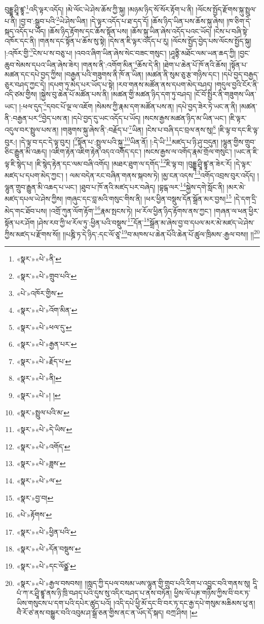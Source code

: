 བུདྡྷ་ཤྲཱི་ཛྙཱ་\footnote{«སྣར་»«པེ་»ནི་}འདི་ལྟར་འདོད། །མེ་ལོང་ཡེ་ཤེས་ཆོས་ཀྱི་སྐུ། །མཉམ་ཉིད་སོ་སོར་རྟོག་པ་ནི། །ལོངས་སྤྱོད་རྫོགས་སྐུ་སྤྲུལ་པ་ནི། །བྱ་བ་:སྒྲུབ་པའི་\footnote{«སྣར་»«པེ་»གྲུབ་པའི་}ཡེ་ཤེས་ཡིན། །དེ་ལྟར་འདོད་པ་ཐ་དད་དོ། །ཆོས་ཉིད་ཡིན་པས་ཆོས་སྐུ་ཞེས། །ཁ་ཅིག་དེ་སྐད་འདོད་པ་ཡོད། །ཆོས་ཉིད་རྟོགས་དང་ཆོས་སྟོན་པས། །ཆོས་སྐུ་ཡིན་ཞེས་འདོད་པའང་ཡོད། །ངེས་པ་བཞི་སྟེ་འཁོར་དང་ནི། །གནས་དང་སྟོན་པ་ཆོས་སུ་སྟེ། །དེས་ན་ཇི་ལྟར་འདོད་པ་རུ། །ལོངས་སྤྱོད་བྱེད་པས་ལོངས་སྤྱོད་སྐུ། །:འཁོར་གྱི་\footnote{«པེ་»འཁོར་གྱིས་}ངེས་པ་ས་བཅུ་པ། །འབའ་ཞིག་ཡིན་ཞེས་སེང་བཟང་གསུང་། །ཤཱནྟི་མཐོང་ལམ་ཡན་ཆད་ཀྱི། །བྱང་ཆུབ་སེམས་དཔའ་ཡིན་ཞེས་ཟེར། །གནས་ནི་:འགོག་མིན་\footnote{«སྣར་»«པེ་»འོག་མིན་}ཆོས་དེ་ནི། །ཐེག་པ་ཆེན་པོ་ཁོ་ནའི་ཆོས། །སྟོན་པ་མཚན་དང་དཔེ་བྱད་ཀྱིས། །བརྒྱན་པའི་གཟུགས་ནི་ཁོ་ན་ཡིན། །མཚན་ནི་སུམ་ཅུ་རྩ་གཉིས་དང་། །དཔེ་བྱད་བརྒྱད་ཅུར་བཤད་ཀྱང་དེ། །དཔག་ཏུ་མེད་པར་ཡོད་པ་སྟེ། །རབ་གནས་མཚོན་ནས་དཔག་མེད་བཤད། །གདུལ་བྱའི་ངོར་ནི་འདི་ཙམ་གྱིས། །སྐྱེས་བུ་ཆེན་པོ་མཚོན་པས་ནི། །མཚན་གྱི་མཚན་ཉིད་དག་ཏུ་བཤད། །ངོ་བོ་སྤྱིར་ནི་གཟུགས་ཡིན་ཡང་། །:ཕལ་དུད་\footnote{«སྣར་»«པེ་»ཕལ་དུ་}དབང་པོ་ལྔ་ལ་འཇོག །སེམས་ཀྱི་རྣམ་དག་མཚོན་པས་ན། །དཔེ་བྱད་ཟེར་ཏེ་ཡང་ན་ནི། །མཚན་ནི་:བརྒྱན་པར་\footnote{«སྣར་»«པེ་»རྒྱན་པར་}བྱེད་པས་ན། །དཔེ་བྱད་དུ་ཡང་འདོད་པ་ཡོད། །སངས་རྒྱས་མཚན་ཉིད་མ་ཡིན་ཡང་། །ཇི་ལྟར་འདུལ་བར་སྤྲུལ་པས་ན། །གཟུགས་སྐུ་ཞེས་ནི་:བརྗོད་པ་\footnote{«སྣར་»«པེ་»རྗོད་པ་}ཡིན། །ངེས་པ་བཞི་དང་བྲལ་ནས་སུ།\footnote{«སྣར་»«པེ་»ནི།} །ཇི་ལྟ་བ་དང་ཇི་ལྟ་བུར:། །དེ་ལྟ་བ་དང་དེ་ལྟ་བུར། །\footnote{«སྣར་»«པེ་»། །}སྟོན་པ་:སྤྲུལ་པའི་སྐུ་\footnote{«སྣར་»སྤྲུལ་པའི་མ་}ཡིན་ནོ། །:དེ་ཡི་\footnote{«སྣར་»«པེ་»དེ་ཡིས་}མཛད་པ་ཉི་ཤུ་བདུན། །ལྷུན་གྱིས་གྲུབ་ཅིང་རྒྱུན་མི་འཆད། །འཇིག་རྟེན་འཇིག་རྟེན་འདའ་འགོད་དང་། །སངས་རྒྱས་ལ་འགོད་རྣམ་གྲོལ་གསུང་། །ཡང་ན་ཇི་ལྟ་ཇི་སྙེད་པ། །ཇི་སྙེད་རྟེན་དང་ལམ་བཞི་འགོད། །མཐར་ཐུག་ལ་དགོད་\footnote{«སྣར་»«པེ་»འགོད་}ཇི་ལྟ་བ། །བུདྡྷ་ཤྲཱི་ཛྙཱ་ན་ཟེར་རོ། །དེ་ལྟར་མཛད་པ་དཔག་མེད་ཀྱང་། །
ལམ་བདེན་རང་བཞིན་གནས་སྐབས་ཏེ། །མྱ་ངན་འདས་\footnote{«སྣར་»«པེ་»ཟླས་}འགོད་འབྲས་བུར་འདོད། །ལྷུན་གྲུབ་རྒྱུན་མི་འཆད་པ་ཡང་། །ཐུབ་པ་ཁོ་ནའི་མཛད་པར་བཞེད། །བྷངྒ་ལར་\footnote{«སྣར་»«པེ་»ལ་}སྐྱེས་དགེ་སློང་ནི། །མར་མེ་མཛད་དཔལ་ཡེ་ཤེས་ཀྱིས། །གཞུང་དང་བླ་མའི་གསུང་གིས་ནི། །ཕར་ཕྱིན་བསྡུས་དོན་སྒྲོན་མར་བྱས།\footnote{«སྣར་»བྱ་བ།} །དེ་དག་དྲི་མེད་གང་ཐོབ་པས། །འགྲོ་ཀུན་ལོག་རྟོག་\footnote{«པེ་»རྟོགས་}རྣམ་སྤངས་ཏེ། །ཕ་རོལ་ཕྱིན་ཉིད་རྟོགས་ནས་ཀྱང་། །གཞན་ལ་ཕན་ཕྱིར་སྟོན་པར་ཤོག །ཤེས་རབ་ཀྱི་ཕ་རོལ་ཏུ་:ཕྱིན་པའི་བསྡུས་\footnote{«སྣར་»«པེ་»ཕྱིན་པའི་}དོན་\footnote{«སྣར་»«པེ་»དོན་བསྡུས་}སྒྲོན་མ་ཞེས་བྱ་བ་དཔལ་མར་མེ་མཛད་ཡེ་ཤེས་ཀྱིས་མཛད་པ་རྫོགས་སོ།། །།པཎྜི་ཏ་དེ་ཉིད་:དང་ལོ་ཙཱ་\footnote{«སྣར་»«པེ་»དང་ལོཙྪ་}བ་མཁས་པ་ཆེན་པོའི་ཆེན་པོ་ཚུལ་ཁྲིམས་:རྒྱལ་བས།། །།\footnote{«སྣར་»«པེ་»རྒྱལ་བསབས།། །།སླད་ཀྱི་དཔལ་བསམ་ཡས་ལྷུན་གྱི་གྲུབ་པའི་རིག་པ་འབྱུང་བའི་གནས་སུ། དཱི་པཾ་ཀ་ར་ཤྲཱི་ཛྙཱ་ནས་ཉི་ཁྲི་བཤད་པའི་དུས་སུ་འདིར་བཤད་པ་ནས་བཏོན། ཕྱིས་ལོ་པཎ་གཉིས་ཀྱིས་བི་བར་ཏ་ཡིས་གསུངས་པ་དག་པའི་དཔེར་ཚུད་པའོ། །འདི་དཔེ་ཕྱི་མོ་དང་བི་བར་ཏ་དང་རྒྱ་དཔེ་གསུམ་མཆིམས་ཕུ་ན། བཻ་རོ་ཙ་ནས་བསྒྱུར་བའི་འབུམ་ཤ་སྒྲོ་ཅན་གྱིས་ནང་ན་ཡོད་དོ་སྐད། བཀྲ་ཤིས། །}